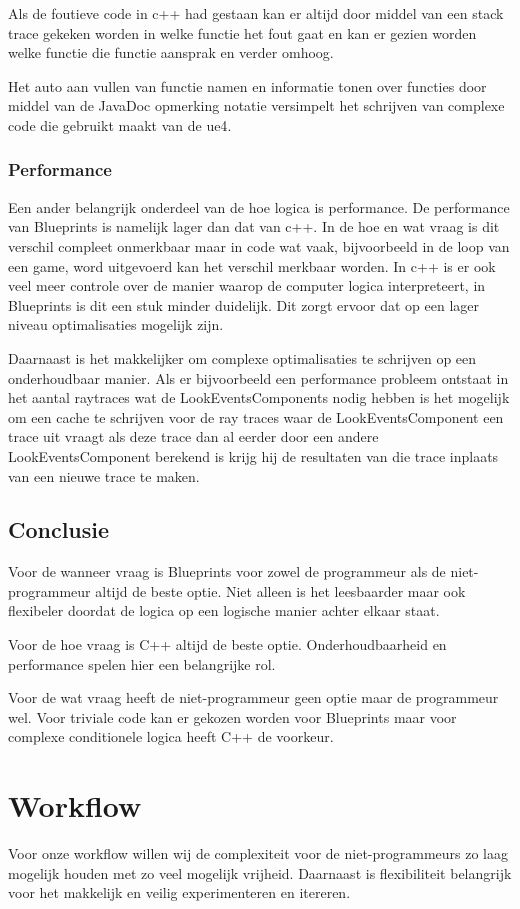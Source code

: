 Als de foutieve code in c++ had gestaan kan er altijd door middel van een stack trace gekeken worden in welke functie het fout gaat en kan er gezien worden welke functie die functie aansprak en verder omhoog. 

Het auto aan vullen van functie namen en informatie tonen over functies door middel van de JavaDoc opmerking notatie versimpelt het schrijven van complexe code die gebruikt maakt van de \gls{ue4}. 

\subsubsection{Performance}
Een ander belangrijk onderdeel van de hoe logica is performance. De performance van Blueprints is namelijk lager dan dat van c++. In de hoe en wat vraag is dit verschil compleet onmerkbaar maar in code wat vaak, bijvoorbeeld in de loop van een game, word uitgevoerd kan het verschil merkbaar worden.
In c++ is er ook veel meer controle over de manier waarop de computer logica interpreteert, in Blueprints is dit een stuk minder duidelijk. Dit zorgt ervoor dat op een lager niveau optimalisaties mogelijk zijn. 

Daarnaast is het makkelijker om complexe optimalisaties te schrijven op een onderhoudbaar manier. Als er bijvoorbeeld een performance probleem ontstaat in het aantal raytraces wat de LookEventsComponents nodig hebben is het mogelijk om een cache te schrijven voor de ray traces waar de LookEventsComponent een trace uit vraagt als deze trace dan al eerder door een andere LookEventsComponent berekend is krijg hij de resultaten van die trace inplaats van een nieuwe trace te maken.

\subsection{Conclusie}
Voor de wanneer vraag is Blueprints voor zowel de programmeur als de niet-programmeur altijd de beste optie. Niet alleen is het leesbaarder maar ook flexibeler doordat de logica op een logische manier achter elkaar staat.

Voor de hoe vraag is C++ altijd de beste optie. Onderhoudbaarheid en performance spelen hier een belangrijke rol. 

Voor de wat vraag heeft de niet-programmeur geen optie maar de programmeur wel. Voor triviale code kan er gekozen worden voor Blueprints maar voor complexe conditionele logica heeft C++ de voorkeur. 

\section{Workflow}
Voor onze workflow willen wij de complexiteit voor de niet-programmeurs zo laag mogelijk houden met zo veel mogelijk vrijheid. Daarnaast is flexibiliteit belangrijk voor het makkelijk en veilig experimenteren en itereren.

